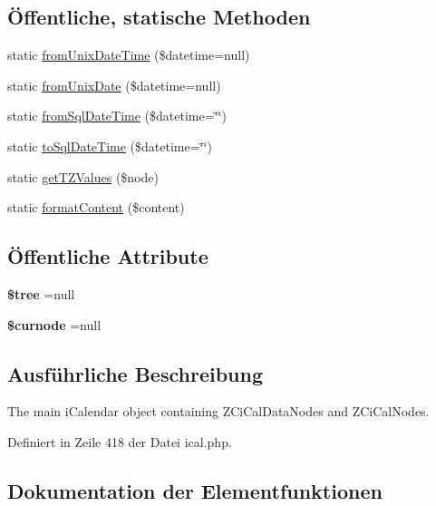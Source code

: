 \subsection*{Öffentliche, statische Methoden}
\begin{DoxyCompactItemize}
\item 
static \mbox{\hyperlink{class_z_ci_cal_a08385d87a6168835952fdc8e6118ee42}{from\+Unix\+Date\+Time}} (\$datetime=null)
\item 
static \mbox{\hyperlink{class_z_ci_cal_aeec969693d373f541b999e32d8b8f8c1}{from\+Unix\+Date}} (\$datetime=null)
\item 
static \mbox{\hyperlink{class_z_ci_cal_ad6053090c0bb9c5edc832790b33bee33}{from\+Sql\+Date\+Time}} (\$datetime=\char`\"{}\char`\"{})
\item 
static \mbox{\hyperlink{class_z_ci_cal_a14cab50872568db88b1d132a6dab73e6}{to\+Sql\+Date\+Time}} (\$datetime=\char`\"{}\char`\"{})
\item 
static \mbox{\hyperlink{class_z_ci_cal_a4d7326050f7f906a9c608176f6894904}{get\+T\+Z\+Values}} (\$node)
\item 
static \mbox{\hyperlink{class_z_ci_cal_acfd0acd8b506d8646a053d14b57bf35b}{format\+Content}} (\$content)
\end{DoxyCompactItemize}
\subsection*{Öffentliche Attribute}
\begin{DoxyCompactItemize}
\item 
\mbox{\label{class_z_ci_cal_a1c5737ed9cd91680ebd7a823509f55d2}} 
{\bfseries \$tree} =null
\item 
\mbox{\label{class_z_ci_cal_ada7bfd258dc5abcdbdfc774c457093c8}} 
{\bfseries \$curnode} =null
\end{DoxyCompactItemize}


\subsection{Ausführliche Beschreibung}
The main i\+Calendar object containing Z\+Ci\+Cal\+Data\+Nodes and Z\+Ci\+Cal\+Nodes. 

Definiert in Zeile 418 der Datei ical.\+php.



\subsection{Dokumentation der Elementfunktionen}
\mbox{\label{class_z_ci_cal_a73b0dcc6ab0ad3cde8278043f086dce2}} 
